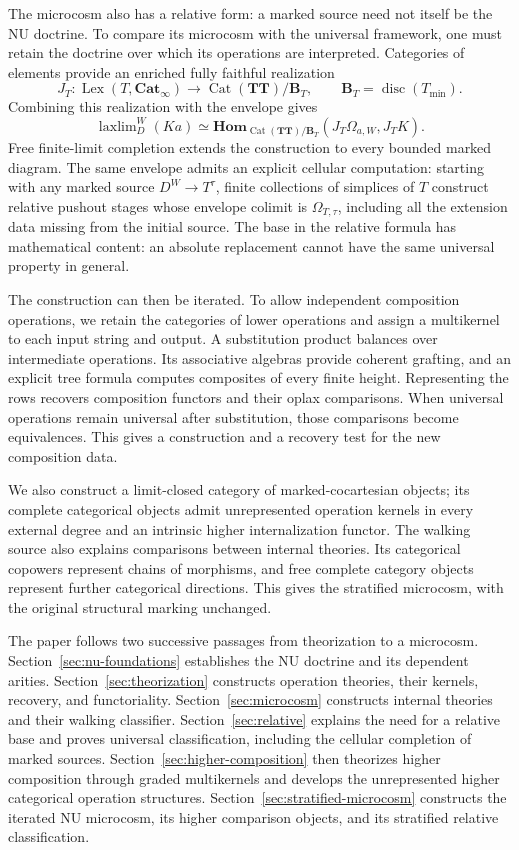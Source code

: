 \documentclass[oneside]{article}
\theoremstyle{plain}
\theoremstyle{definition}
\theoremstyle{remark}
\newcommand{\B}{\mathbf B}
\newcommand{\Cat}{\mathbf{Cat}_{\infty}}
\newcommand{\Homc}{\mathbf{Hom}}
\newcommand{\J}{J}
\newcommand{\Lex}{\operatorname{Lex}}
\newcommand{\TT}{\mathbf{TT}}
\newcommand{\disc}{\operatorname{disc}}
\newcommand{\laxlim}{\mathop{\mathrm{laxlim}}}
\newcommand{\minrep}{\mathrm{min}}
\begin{document}
The microcosm also has a relative form: a marked source need not itself
be the NU doctrine. To compare its microcosm with the universal
framework, one must retain the doctrine
over which its operations are interpreted. Categories of elements provide
an enriched fully faithful realization
\[
 \J_T:\Lex(T,\Cat)\longrightarrow
 \operatorname{Cat}(\TT)/\B_T,
 \qquad \B_T=\disc(T_{\minrep}).
\]
Combining this realization with the envelope gives
\begin{equation}\label{eq:intro-relative}
 \laxlim_D^W(Ka)\simeq
 \Homc_{\operatorname{Cat}(\TT)/\B_T}
       (\J_T\Omega_{a,W},\J_TK).
\end{equation}
Free finite-limit completion extends the construction to every bounded
marked diagram. The same envelope admits an explicit cellular computation:
starting with any marked source $D^W\to T^\tau$, finite collections of
simplices of $T$ construct relative pushout stages whose envelope colimit
is $\Omega_{T,\tau}$, including all the extension data missing from the
initial source. The base in the relative formula has mathematical content:
an absolute replacement cannot have the same universal property in general.

The construction can then be iterated. To allow independent composition operations, we retain the
categories of lower operations and assign a multikernel to each input
string and output. A substitution product balances over intermediate
operations. Its associative algebras provide coherent grafting, and an
explicit tree formula computes composites of every finite height.
Representing the rows recovers composition functors and their oplax
comparisons. When universal operations remain universal after
substitution, those comparisons become equivalences. This gives a
construction and a recovery test for the new composition data.

We also construct a limit-closed category of marked-cocartesian objects;
its complete categorical objects admit unrepresented operation kernels
in every external degree and an intrinsic higher internalization functor.
The walking source also explains comparisons between internal theories.
Its categorical copowers represent chains of morphisms, and free complete
category objects represent further categorical directions. This gives the
stratified microcosm, with the original structural marking unchanged.

The paper follows two successive passages from theorization to a
microcosm. Section~\ref{sec:nu-foundations} establishes the NU doctrine
and its dependent arities. Section~\ref{sec:theorization} constructs
operation theories, their kernels, recovery, and functoriality.
Section~\ref{sec:microcosm} constructs internal theories and their
walking classifier. Section~\ref{sec:relative} explains the need for a
relative base and proves universal classification, including the
cellular completion of marked sources. Section~\ref{sec:higher-composition}
then theorizes higher composition through graded multikernels and develops
the unrepresented higher categorical operation structures.
Section~\ref{sec:stratified-microcosm} constructs the iterated NU
microcosm, its higher comparison objects, and its stratified relative
classification.
\end{document}
